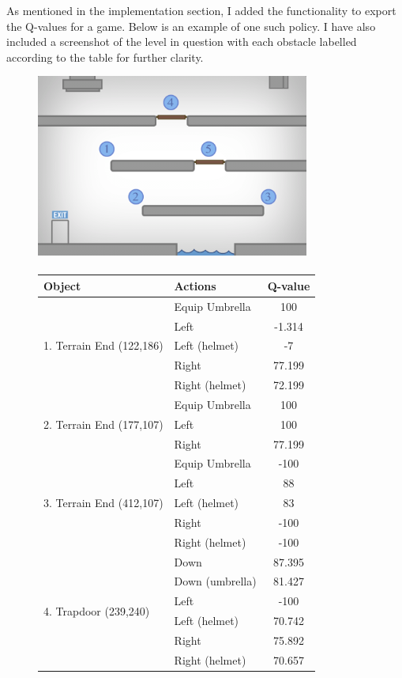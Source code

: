 \documentclass[a4paper,oneside]{report}
\begin{document}
As mentioned in the implementation section, I added the functionality to export the Q-values for a game. Below is an example of one such policy. I have also included a screenshot of the level in question with each obstacle labelled according to the table for further clarity.

\begin{figure}[h!]
\centering    

\includegraphics[width=90mm]{sources/images/Level2} \paragraph{}

\begin{tabular}{|l|l|c|}
\hline
Object & Actions & Q-value \\ \hline

\multirow{5}{*}{1. Terrain End (122,186)} & Equip Umbrella & 100 \\
 & Left & -1.314 \\
 & Left (helmet) & -7 \\
 & Right & 77.199 \\ 
 & Right (helmet) & 72.199 \\ \hline
 
\multirow{3}{*}{2. Terrain End (177,107)} & Equip Umbrella & 100 \\
 & Left & 100 \\
 & Right & 77.199 \\ \hline
 
\multirow{5}{*}{3. Terrain End (412,107)} & Equip Umbrella & -100 \\
 & Left & 88 \\
 & Left (helmet) & 83 \\
 & Right & -100 \\
 & Right (helmet) & -100 \\ \hline

\multirow{6}{*}{4. Trapdoor (239,240)} & Down & 87.395 \\
 & Down (umbrella) & 81.427 \\
 & Left & -100 \\
 & Left (helmet) & 70.742 \\
 & Right & 75.892 \\
 & Right (helmet) & 70.657 \\ \hline


\end{tabular}
\end{figure}
\end{document}
